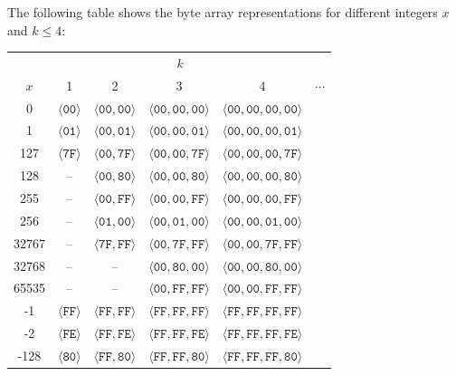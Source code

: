 \documentclass[bibtotoc,halfparskip,oneside]{scrreprt}
\newcommand{\hex}[1]{\ensuremath{\mathtt{#1}}}
\begin{document}
	The following table shows the byte array representations for different integers $x$ and $k\leq 4$:
	
	\begin{center}
		\begin{tabular}{c|ccccc}
			\multicolumn{1}{c}{}& \multicolumn{4}{c}{$k$} \\
			$x$  & 1 & 2 & 3  & 4 & $\cdots$ \\\cline{1-6}
			0     & $\langle \hex{00}\rangle$ & $\langle\hex{00},\hex{00}\rangle$ & $\langle\hex{00},\hex{00},\hex{00}\rangle$& $\langle\hex{00},\hex{00},\hex{00},\hex{00}\rangle$ \\
			1     & $\langle\hex{01}\rangle$ & $\langle\hex{00},\hex{01}\rangle$ & $\langle\hex{00},\hex{00},\hex{01}\rangle$& $\langle\hex{00},\hex{00},\hex{00},\hex{01}\rangle$\\
			127   & $\langle\hex{7F}\rangle$ & $\langle\hex{00},\hex{7F}\rangle$ & $\langle\hex{00},\hex{00},\hex{7F}\rangle$ & $\langle\hex{00},\hex{00},\hex{00},\hex{7F}\rangle$\\
			128   & -- & $\langle\hex{00},\hex{80}\rangle$ & $\langle\hex{00},\hex{00},\hex{80}\rangle$ & $\langle\hex{00},\hex{00},\hex{00},\hex{80}\rangle$\\
			255   & -- & $\langle\hex{00},\hex{FF}\rangle$ & $\langle\hex{00},\hex{00},\hex{FF}\rangle$ & $\langle\hex{00},\hex{00},\hex{00},\hex{FF}\rangle$\\
			256   & -- & $\langle\hex{01},\hex{00}\rangle$ & $\langle\hex{00},\hex{01},\hex{00}\rangle$ & $\langle\hex{00},\hex{00},\hex{01},\hex{00}\rangle$\\
			32767 & -- & $\langle\hex{7F},\hex{FF}\rangle$ & $\langle\hex{00},\hex{7F},\hex{FF}\rangle$ & $\langle\hex{00},\hex{00},\hex{7F},\hex{FF}\rangle$\\
			32768 & -- & -- & $\langle\hex{00},\hex{80},\hex{00}\rangle$ & $\langle\hex{00},\hex{00},\hex{80},\hex{00}\rangle$\\
			65535 & -- & -- & $\langle\hex{00},\hex{FF},\hex{FF}\rangle$ & $\langle\hex{00},\hex{00},\hex{FF},\hex{FF}\rangle$\\
			-1    & $\langle\hex{FF}\rangle$ & $\langle\hex{FF},\hex{FF}\rangle$ & $\langle\hex{FF},\hex{FF},\hex{FF}\rangle$& $\langle\hex{FF},\hex{FF},\hex{FF},\hex{FF}\rangle$\\
			-2    & $\langle\hex{FE}\rangle$ & $\langle\hex{FF},\hex{FE}\rangle$ & $\langle\hex{FF},\hex{FF},\hex{FE}\rangle$& $\langle\hex{FF},\hex{FF},\hex{FF},\hex{FE}\rangle$\\
			-128   & $\langle\hex{80}\rangle$ & $\langle\hex{FF},\hex{80}\rangle$ & $\langle\hex{FF},\hex{FF},\hex{80}\rangle$ & $\langle\hex{FF},\hex{FF},\hex{FF},\hex{80}\rangle$\\

\end{tabular}
\end{center}
\end{document}
